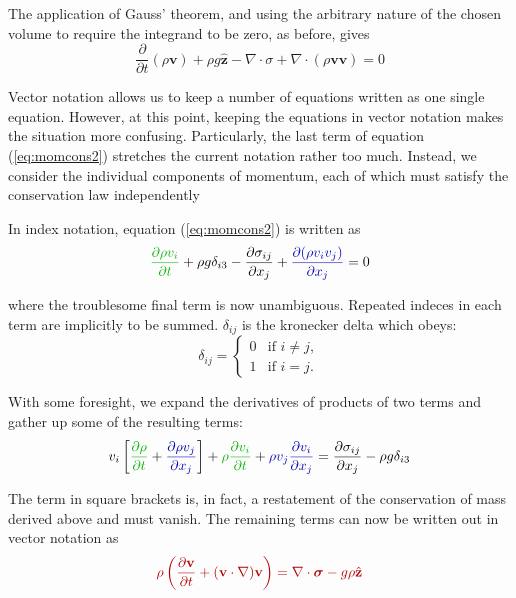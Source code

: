 \documentclass[10pt]{article}
\begin{document}
	The application of Gauss' theorem, and using the arbitrary nature of 
	the chosen volume to require the integrand to be zero, as before,  gives	
		\begin{equation}
			 \frac{\partial}{\partial t}(\rho \mathbf{v}) 
			+\rho g \hat{\mathbf{z}} - \nabla \cdot \sigma + \nabla \cdot (\rho \mathbf{v} \mathbf{v}) = 0
			\label{eq:momcons2}
		\end{equation}	
		
	Vector notation allows us to keep a number of equations
	written as one single equation. However, 
	at this point, keeping the equations in vector notation
	makes the situation more confusing. Particularly, the last term
	of equation (\ref{eq:momcons2}) stretches the current notation
	rather too much. Instead, we consider the individual components of
	momentum, each of which must satisfy the conservation law 
	independently
	
	In index notation, equation (\ref{eq:momcons2}) is written as
		\begin{equation}
			\Green{\frac{\partial \rho v_i}{\partial t}} + \rho g \delta_{i3} - 
			\frac{\partial \sigma_{ij}}{\partial x_j} +
			\Blue{\frac{\partial(\rho v_i v_j)}{\partial x_j}} = 0
			\label{eq:momindx}
		\end{equation}
		
	where the troublesome final term is now  
	unambiguous. Repeated indeces in each term are
	implicitly to be summed.	$\delta_{ij}$ is the kronecker delta which obeys:
		\begin{equation}
			\delta_{ij} = \begin{cases}
				0 & \text{if $i \neq j$}, \\
				1 & \text{if $i = j$}.
			\end{cases}	
		\end{equation}
		
	With some foresight, we expand the derivatives of  products of two terms and gather up
	some of the resulting terms:
		\begin{equation}
			v_i \left[\Green{\frac{\partial \rho}{\partial t}} +
			 \Blue{ \frac{\partial \rho v_j}{\partial x_j}} \right]
			+ \Green{\rho \frac{\partial v_i}{\partial t}} + \Blue{\rho v_j \frac{\partial v_i}{\partial x_j}} =
			\frac{\partial \sigma_{ij}}{\partial x_j} -\rho g \delta_{i3} 
		\end{equation}
	
	The term in square brackets is, in fact, a restatement of the conservation of mass derived above and 
	must vanish. The remaining terms can now be written out in vector notation as
		\begin{equation}
			\Red{	\rho \left( \frac{\partial \mathbf{v}}{\partial t}
							+ (\mathbf{v} \cdot \nabla) \mathbf{v} \right) =
						 \nabla \cdot \boldsymbol{\sigma} - g\rho\hat{\mathbf{z}}      }
			\label{eq:momcons3}
		\end{equation}
\end{document}
